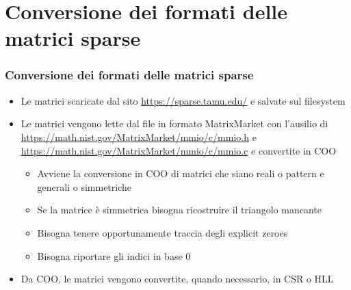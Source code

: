 \documentclass{beamer}
\begin{document}
\section{Conversione dei formati delle matrici sparse}
\begin{frame}
    \frametitle{Conversione dei formati delle matrici sparse}
    
    \begin{itemize}
    	\item Le matrici scaricate dal sito \url{https://sparse.tamu.edu/} e salvate sul 
    		filesystem
    	\item Le matrici vengono lette dal file in formato MatrixMarket con l'ausilio di
    		\url{https://math.nist.gov/MatrixMarket/mmio/c/mmio.h} e 
    		\url{https://math.nist.gov/MatrixMarket/mmio/c/mmio.c} e convertite in COO
    	\begin{itemize}
    		\item Avviene la conversione in COO di matrici che siano
    		reali o pattern e generali o simmetriche
    		\item Se la matrice è simmetrica bisogna ricostruire il triangolo mancante
    		\item Bisogna tenere opportunamente traccia degli explicit zeroes
    		\item Bisogna riportare gli indici in base 0
    	\end{itemize}
    	
    	\item Da COO, le matrici vengono convertite, quando necessario, in CSR o HLL
    \end{itemize}
\end{frame}
\end{document}
